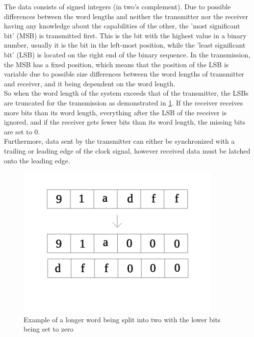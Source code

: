 The data consists of signed integers (in two's complement).
Due to possible differences between the word lengths and neither the transmitter nor the
receiver having any knowledge about the capabilities of the other, the 'most significant bit' (MSB) is transmitted first.
This is the bit with the highest value in a binary number, usually it is the bit in the left-most position,
while the 'least significant bit' (LSB) is located on the right end of the binary sequence.
In the transmission, the MSB has a fixed position, which means that the position of the LSB
is variable due to possible size differences between the word lengths of transmitter and receiver,
and it being dependent on the word length.\\
So when the word length of the system exceeds that of the transmitter, the LSBs are truncated
for the transmission as demonstrated in \ref{fig:truncation}.
If the receiver receives more bits than its word length, everything after the LSB
of the receiver is ignored, and if the receiver gets fewer bits than its word length,
the missing bits are set to 0.\\
Furthermore, data sent by the transmitter can either be synchronized with a trailing or leading edge
of the clock signal, however received data must be latched onto the leading edge.


\begin{figure}[htb]
    \centering
    \includegraphics[width=0.9\textwidth]{figures/fundamentals_truncation.png}
    \caption[Illustration: Truncation of words]{Example of a longer word being split into two with the lower bits being set to zero}
    \label{fig:truncation}
\end{figure}

